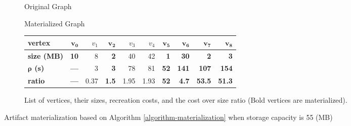 \begin{figure}
\begin{subfigure}{0.5\linewidth}
\centering

\caption{Original Graph}
\end{subfigure}%
\begin{subfigure}{0.5\linewidth}
\centering

\caption{Materialized Graph}
\end{subfigure}
\begin{subfigure}{\linewidth}
\setlength\tabcolsep{3.5pt} %
\begin{tabular}{l | | >{\bfseries}r | r  |>{\bfseries}r | r | r | >{\bfseries}r | >{\bfseries}r | >{\bfseries}r |>{\bfseries}r }
\hline
\textbf{vertex} & $\boldsymbol{v_0}$ & $v_1$ & $\boldsymbol{v_2}$ & $v_3$ & $v_4$ & $\boldsymbol{v_5}$ & $\boldsymbol{v_6}$ & $\boldsymbol{v_7}$ &$\boldsymbol{v_8}$ \\
\hline
\textbf{size (MB)}    & 10 & 8 & 2 & 40 & 42 & 1 & 30 & 2   & 3        \\
\textbf{$\boldsymbol{\rho}$ (s)} & ---   & 3 & 3 & 78 & 81 & 52 & 141 & 107 & 154	  \\
\textbf{ratio}& ---   & 0.37 & 1.5 & 1.95 & 1.93 & 52 & 4.7 & 53.5 & 51.3	\\
\hline
\end{tabular}
\caption{List of vertices, their sizes, recreation costs, and the cost over size ratio (Bold vertices are materialized).}
\end{subfigure}
\caption{Artifact materialization based on Algorithm \ref{algorithm-materialization} when storage capacity is 55 (MB)}
\label{fig-materialization-example}
\end{figure}

